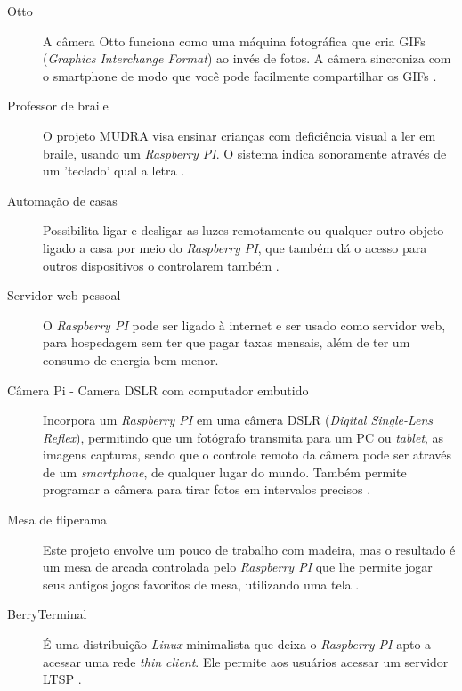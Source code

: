 \documentclass[
	12pt,				%
	openright,			%
	twoside,			%
	a4paper,			%
	chapter=TITLE,		%
	english,			%
	brazil				%
	]{abntex2}
\begin{document}
\begin{description}

\item[Otto]A câmera Otto funciona como uma máquina fotográfica que cria GIFs (\textit{Graphics Interchange Format}) ao invés de fotos. A câmera sincroniza com o smartphone de modo que você pode facilmente compartilhar os GIFs \cite{otto}.
  
\item[Professor de braile] O projeto MUDRA visa ensinar crianças com deficiência visual a ler em braile, usando um \textit{Raspberry PI}. O sistema indica sonoramente através de um ’teclado’ qual a  letra \cite{mudra}.

\item[Automação de casas] Possibilita ligar e desligar as luzes remotamente ou qualquer outro objeto ligado a casa por meio do \textit{Raspberry PI}, que também dá o acesso para outros dispositivos o controlarem também \cite{AplicacaoRaspberry}.

\item[Servidor web pessoal] O \textit{Raspberry PI} pode ser ligado à internet e ser usado como servidor web, para hospedagem sem ter que pagar taxas mensais, além de ter um consumo de energia bem menor.


\item[Câmera Pi - Camera  DSLR com computador embutido] Incorpora um \textit{Raspberry PI} em uma câmera DSLR (\textit{Digital Single-Lens Reflex}), permitindo que um fotógrafo transmita para um PC ou \textit{tablet}, as imagens capturas, sendo que o controle remoto da câmera pode ser através de um \textit{smartphone}, de qualquer lugar do mundo. Também permite programar a câmera para tirar fotos em intervalos precisos \cite{cameraPI}.

\item[Mesa de fliperama] Este projeto envolve um pouco de trabalho com madeira, mas o resultado é um mesa de arcada controlada pelo \textit{Raspberry PI} que lhe permite jogar seus antigos jogos favoritos de mesa, utilizando uma tela \cite{AplicacaoRaspberry}.

\item[BerryTerminal] É uma distribuição \textit{Linux} minimalista que deixa o \textit{Raspberry PI} apto a acessar uma rede \textit{thin client}. Ele permite aos usuários acessar um servidor LTSP \cite{berryterminal}.

\end{description}


\end{document}
